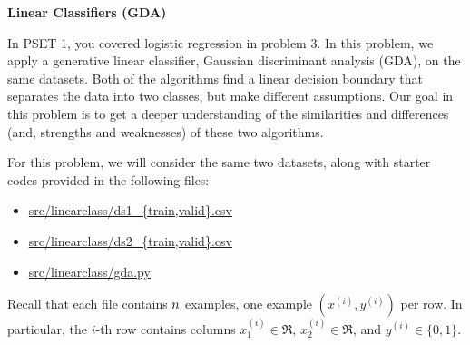 \item {} {\bf Linear Classifiers (GDA)}

In PSET 1, you covered logistic regression in problem 3. In this problem, we apply a generative linear classifier, Gaussian discriminant
analysis (GDA), on the same datasets. Both of the algorithms find a linear decision boundary that
separates the data into two classes, but make different assumptions. Our goal
in this problem is to get a deeper understanding of the similarities and
differences (and, strengths and weaknesses) of these two algorithms.

For this problem, we will consider the same two datasets, along with starter codes provided in the following
files:
\begin{center}
\begin{itemize} %
	\item \url{src/linearclass/ds1_{train,valid}.csv}
	\item \url{src/linearclass/ds2_{train,valid}.csv}
        \item \url{src/linearclass/gda.py}
\end{itemize}
\end{center}
Recall that each file contains ${n}$ examples, one example $(x^{(i)}, y^{(i)})$ per row.
In particular, the $i$-th row contains columns $x^{(i)}_1\in\Re$,
$x^{(i)}_2\in\Re$, and $y^{(i)}\in\{0, 1\}$.

\begin{enumerate}

	
        \ifnum{} {
            
        }\fi

	
        \ifnum{} {
            
        } \fi

	
        \ifnum{} {
            
        } \fi

	
        \ifnum{} {
            
        } \fi

	
        \ifnum{}\fi

\end{enumerate}
